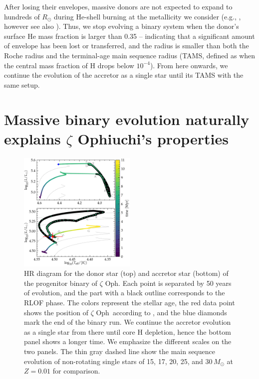 \documentclass[twocolumn,twocolappendix,trackchanges]{aastex63}
\DeclareRobustCommand{\Secref}[1]{Sec.~\ref{#1}}
\newcommand{\zoph}{$\zeta$ Oph}
\begin{document}
After losing their envelopes, massive donors are not expected to
expand to hundreds of $R_\odot$ during He-shell burning at the
metallicity we consider (e.g., \citealt{laplace:20}, however see also
\citealt{gilkis:19}). Thus, we stop evolving a binary system when the
donor's surface He mass fraction is larger than 0.35 -- indicating
that a significant amount of envelope has been lost or transferred,
and the radius is smaller than both the Roche radius and the
terminal-age main sequence radius (TAMS, defined as when the central
mass fraction of H drops below $10^{-4}$). From here
onwards, %
we continue the evolution of the accretor as a single star until its TAMS
with the same setup.


\section{Massive binary evolution naturally explains $\zeta$
  Ophiuchi's properties}
\label{sec:best_model}

\begin{figure}[tp]
  \includegraphics[width=0.5\textwidth]{HRD_both}
  \caption{HR diagram for the donor star (top) and accretor star (bottom) of
    the progenitor binary of \zoph. Each point is separated by 50
    years of evolution, and the part with a black outline corresponds
    to the RLOF phase. The colors represent the stellar age, the red
    data point shows the position of \zoph\ according to
    , and the
    blue diamonds mark the end of the binary run. We
    continue the accretor evolution as a single star from there until
    core H depletion, hence the bottom panel shows a longer time. We
    emphasize the different scales on the two panels. The thin gray
    dashed line show the main sequence evolution of non-rotating
    single stars of 15, 17, 20, 25, and 30\,$M_\odot$ at $Z=0.01$ for
    comparison.}
  \label{fig:HRD_both}
\end{figure}
\end{document}
